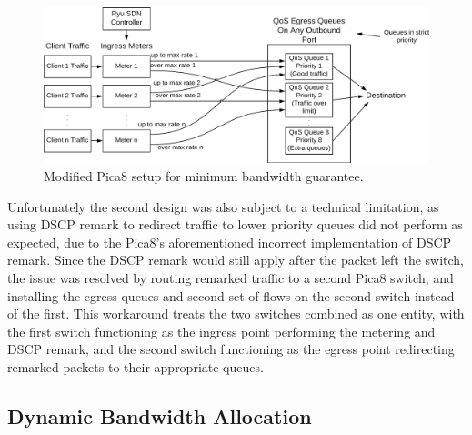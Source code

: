 \documentclass[accepted,single]{gipaper}
\begin{document}
\begin{figure}
	\centering
	\includegraphics[width=6in]{figs/bwGuar_v2.png}
	\caption{ Modified Pica8 setup for minimum bandwidth guarantee. } \label{bwDiag2}
\end{figure}

Unfortunately the second design was also subject to a technical limitation, as using DSCP remark to redirect traffic to lower priority queues did not perform as expected, due to the Pica8's aforementioned incorrect implementation of DSCP remark. Since the DSCP remark would still apply after the packet left the switch, the issue was resolved by routing remarked traffic to a second Pica8 switch, and installing the egress queues and second set of flows on the second switch instead of the first. This workaround treats the two switches combined as one entity, with the first switch functioning as the ingress point performing the metering and DSCP remark, and the second switch functioning as the egress point redirecting remarked packets to their appropriate queues.


\subsection{Dynamic Bandwidth Allocation}
\label{min_bandwidth}
\end{document}
